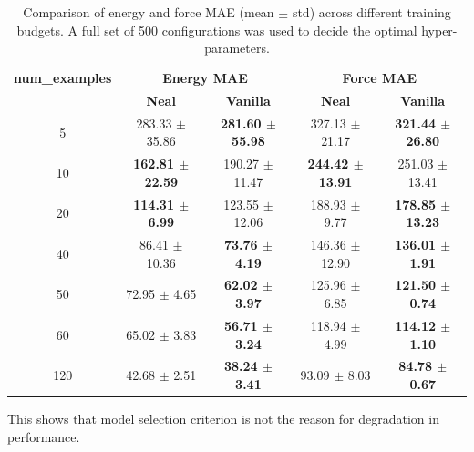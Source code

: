\documentclass[12pt]{article}
\theoremstyle{definition}
\theoremstyle{remark}
\begin{document}
\newpage
\begin{table}[htbp]
\centering
\begin{tabular}{c|cc|cc}
\hline
\textbf{num\_examples} & \multicolumn{2}{c|}{\textbf{Energy MAE}} & \multicolumn{2}{c}{\textbf{Force MAE}} \\
 & \textbf{Neal} & \textbf{Vanilla} & \textbf{Neal} & \textbf{Vanilla} \\
\hline
5   & 283.33 $\pm$ 35.86 & \textbf{281.60 $\pm$ 55.98} & 327.13 $\pm$ 21.17 & \textbf{321.44 $\pm$ 26.80} \\
10  & \textbf{162.81 $\pm$ 22.59} & 190.27 $\pm$ 11.47 & \textbf{244.42 $\pm$ 13.91} & 251.03 $\pm$ 13.41 \\
20  & \textbf{114.31 $\pm$ 6.99} & 123.55 $\pm$ 12.06 & 188.93 $\pm$ 9.77 & \textbf{178.85 $\pm$ 13.23} \\
40  & 86.41 $\pm$ 10.36 & \textbf{73.76 $\pm$ 4.19} & 146.36 $\pm$ 12.90 & \textbf{136.01 $\pm$ 1.91} \\
50  & 72.95 $\pm$ 4.65 & \textbf{62.02 $\pm$ 3.97} & 125.96 $\pm$ 6.85 & \textbf{121.50 $\pm$ 0.74} \\
60  & 65.02 $\pm$ 3.83 & \textbf{56.71 $\pm$ 3.24} & 118.94 $\pm$ 4.99 & \textbf{114.12 $\pm$ 1.10} \\
120 & 42.68 $\pm$ 2.51 & \textbf{38.24 $\pm$ 3.41} & 93.09 $\pm$ 8.03 & \textbf{84.78 $\pm$ 0.67} \\
\hline
\end{tabular}
\caption{Comparison of energy and force MAE (mean $\pm$ std) across different training budgets. A full set of 500 configurations was used to decide the optimal hyper-parameters.}
\label{tab:energy_force_mae}
\end{table}
This shows that model selection criterion is not the reason for degradation in performance.
\end{document}
